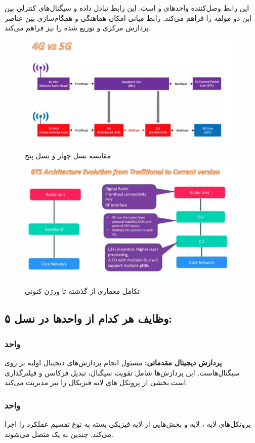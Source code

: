 \documentclass[landscape, 12pt]{report}
\begin{document}
این رابط وصل‌کننده واحدهای
  و
    است. این رابط تبادل داده و سیگنال‌های کنترلی بین این دو مولفه را فراهم می‌کند. رابط میانی امکان هماهنگی و همگام‌سازی بین عناصر پردازش مرکزی و توزیع شده را  نیز فراهم می‌کند.
    
\begin{figure}[ht]
   	\centering
   	\includegraphics[width=.6\linewidth]{Pic/4G_5G}
   	\caption{مقایسه نسل چهار و نسل پنج
   	}
   	\label{fig:4G_5G}
\end{figure}

\begin{figure}[ht]
   	\centering
   	\includegraphics[width=.6\linewidth]{Pic/BTS_Evaluation}
   	\caption{تکامل معماری
   		    		از گذشته تا ورژن کنونی
    	}
   	\label{fig:BTS_Evaluation}
\end{figure}
\subsection*{وظایف هر کدام از واحدها در نسل ۵:}
\subsubsection*{واحد
	 }
\textbf{پردازش دیجیتال مقدماتی:} 
مسئول انجام پردازش‌های دیجیتال اولیه بر روی سیگنال‌هاست. این پردازش‌ها شامل تقویت سیگنال، تبدیل فرکانس و فیلترگذاری است.بخشی از پروتکل های لایه فیزیکال را نیز مدیریت می‌کند.
\subsubsection*{واحد
	 }
پروتکل‌های لایه
، لایه
  و بخش‌هایی از لایه فیزیکی بسته به نوع تقسیم عملکرد را اجرا می‌کند. چندین
    به یک
      متصل می‌شوند.
\end{document}
